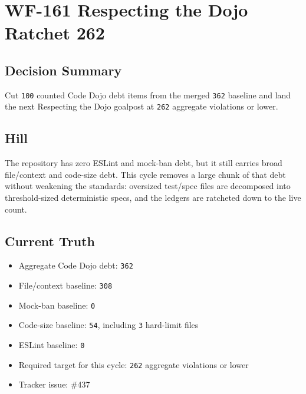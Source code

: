 \chapter{WF-161 Respecting the Dojo Ratchet 262}\label{record-243}

\smallskip

\section{Decision Summary}\label{record-243-decision-summary}

Cut \texttt{1\allowbreak{}0\allowbreak{}0} counted Code Dojo debt items from the merged \texttt{3\allowbreak{}6\allowbreak{}2} baseline and land the next Respecting the Dojo goalpost at \texttt{2\allowbreak{}6\allowbreak{}2} aggregate violations or lower.

\section{Hill}\label{record-243-hill}

The repository has zero ESLint and mock-ban debt, but it still carries broad file/context and code-size debt. This cycle removes a large chunk of that debt without weakening the standards: oversized test/spec files are decomposed into threshold-sized deterministic specs, and the ledgers are ratcheted down to the live count.

\section{Current Truth}\label{record-243-current-truth}

\begin{itemize}
\tightlist
\item
  Aggregate Code Dojo debt: \texttt{3\allowbreak{}6\allowbreak{}2}
\item
  File/context baseline: \texttt{3\allowbreak{}0\allowbreak{}8}
\item
  Mock-ban baseline: \texttt{0}
\item
  Code-size baseline: \texttt{5\allowbreak{}4}, including \texttt{3} hard-limit files
\item
  ESLint baseline: \texttt{0}
\item
  Required target for this cycle: \texttt{2\allowbreak{}6\allowbreak{}2} aggregate violations or lower
\item
  Tracker issue: \#437
\end{itemize}

